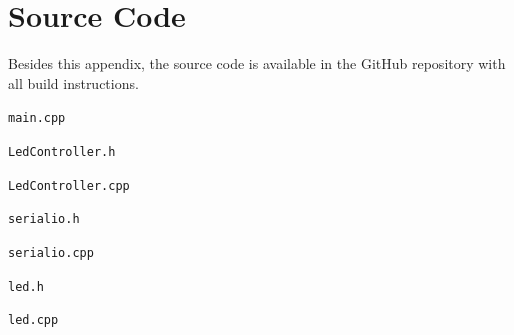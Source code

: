 \appendix

\section{Source Code}

Besides this appendix, the source code is available in the GitHub repository \cite{github} with all build instructions.

\texttt{main.cpp}



\texttt{LedController.h}



\texttt{LedController.cpp}



\texttt{serialio.h}



\texttt{serialio.cpp}



\texttt{led.h}


\texttt{led.cpp}




